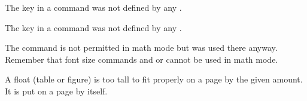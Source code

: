 \begin{plainlist}






\item[] 

    The key in a \cmd{\cite} command was not defined by any \cmd{\bibitem}.

\item[]

    The key in a \cmd{\cite} command was not defined by any \cmd{\bibitem}.


\item[]

    The command is not permitted in math mode but was used there anyway.
Remember that font size commands and \cmd{\boldmath} or \cmd{\unboldmath}
cannot be used in math mode.








\item[]

     A float (table or figure) is too tall to fit properly on a page by
the given amount. It is put on a page by itself.



\end{plainlist}
